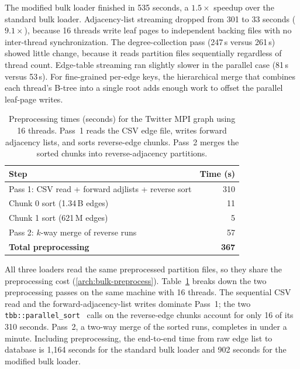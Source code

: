 The modified bulk loader finished in 535 seconds, a $1.5\times$ speedup over the standard bulk loader.
Adjacency-list streaming dropped from 301 to 33 seconds ($9.1\times$), because 16 threads write leaf pages to independent backing files with no inter-thread synchronization.
The degree-collection pass (247\,s versus 261\,s) showed little change, because it reads partition files sequentially regardless of thread count.
Edge-table streaming ran slightly slower in the parallel case (81\,s versus 53\,s). For fine-grained per-edge keys, the hierarchical merge that combines each thread's B-tree into a single root adds enough work to offset the parallel leaf-page writes.
\begin{table}[ht!]
\centering
\begin{tabular}{lr}
\toprule
Step & Time (s) \\
\midrule
Pass 1: CSV read + forward adjlists + reverse sort & 310 \\
\quad Chunk 0 sort (1.34\,B edges)                 &  11 \\
\quad Chunk 1 sort (621\,M edges)                   &   5 \\
Pass 2: $k$-way merge of reverse runs              &  57 \\
\midrule
\textbf{Total preprocessing}                        & \textbf{367} \\
\bottomrule
\end{tabular}
\caption{Preprocessing times (seconds) for the Twitter MPI graph using 16 threads.
Pass~1 reads the CSV edge file, writes forward adjacency lists, and sorts reverse-edge chunks.
Pass~2 merges the sorted chunks into reverse-adjacency partitions.}
\label{tab:preprocess-times}
\end{table}

All three loaders read the same preprocessed partition files, so they share the preprocessing cost (\autoref{arch:bulk-preprocess}).
Table~\ref{tab:preprocess-times} breaks down the two preprocessing passes on the same machine with 16 threads.
The sequential CSV read and the forward-adjacency-list writes dominate Pass~1; the two \texttt{tbb::parallel\_sort}~\cite{onetbb_parallel_sort} calls on the reverse-edge chunks account for only 16 of its 310 seconds.
Pass~2, a two-way merge of the sorted runs, completes in under a minute.
Including preprocessing, the end-to-end time from raw edge list to \wt{} database is 1{,}164 seconds for the standard bulk loader and 902 seconds for the modified bulk loader.


